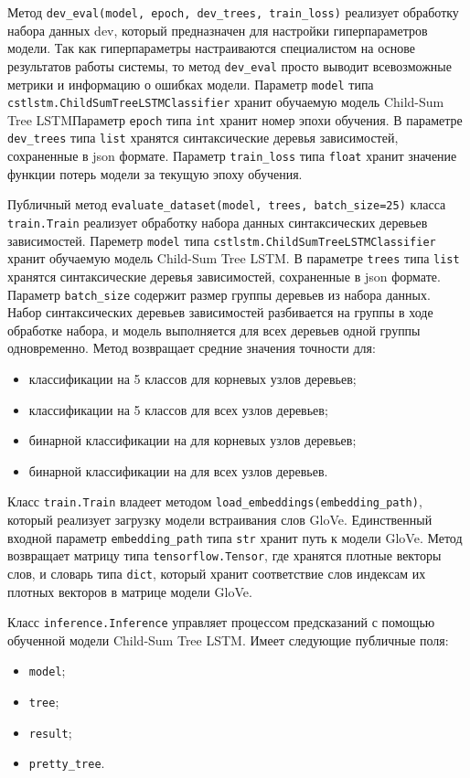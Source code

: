 Метод \texttt{dev\_eval(model, epoch, dev\_trees, train\_loss)} реализует обработку набора данных dev, который предназначен для настройки гиперпараметров модели. Так как гиперпараметры настраиваются специалистом на основе результатов работы системы, то метод \texttt{dev\_eval} просто выводит всевозможные метрики и информацию о ошибках модели. Параметр \texttt{model} типа \texttt{cstlstm.ChildSumTreeLSTMClassifier} хранит обучаемую модель Child-Sum Tree LSTM\@ Параметр \texttt{epoch} типа \texttt{int} хранит номер эпохи обучения. В параметре \texttt{dev\_trees} типа \texttt{list} хранятся синтаксические деревья зависимостей, сохраненные в json формате. Параметр \texttt{train\_loss} типа \texttt{float} хранит значение функции потерь модели за текущую эпоху обучения.

Публичный метод \texttt{evaluate\_dataset(model, trees, batch\_\-size=25)} класса \texttt{train.Train} реализует обработку набора данных синтаксических деревьев зависимостей. Пареметр \texttt{model} типа \texttt{cstlstm.Chi\-ldSumTreeLSTMCla\-ssifier} хранит обучаемую модель Child-Sum Tree LSTM\@. В параметре \texttt{trees} типа \texttt{list} хранятся синтаксические деревья зависимостей, сохраненные в json формате. Параметр \texttt{batch\_size} содержит размер группы деревьев из набора данных. Набор синтаксических деревьев зависимостей разбивается на группы в ходе обработке набора, и модель выполняется для всех деревьев одной группы одновременно. Метод возвращает средние значения точности для:
\begin{itemize}
\item классификации на 5 классов для корневых узлов деревьев;
\item классификации на 5 классов для всех узлов деревьев;
\item бинарной классификации на для корневых узлов деревьев;
\item бинарной классификации на для всех узлов деревьев.
\end{itemize}

Класс \texttt{train.Train} владеет методом \texttt{load\_embeddings(embed\-ding\_path)}, который реализует загрузку модели встраивания слов GloVe. Единственный входной параметр \texttt{embedding\_path} типа \texttt{str} хранит путь к модели GloVe. Метод возвращает матрицу типа \texttt{tensorflow.Tensor}, где хранятся плотные векторы слов, и словарь типа \texttt{dict}, который хранит соответствие слов индексам их плотных векторов в матрице модели GloVe.

Класс \texttt{inference.Inference} управляет процессом предсказаний с помощью обученной модели Child-Sum Tree LSTM\@. Имеет следующие публичные поля:
\begin{itemize}
\item \texttt{model};
\item \texttt{tree};
\item \texttt{result};
\item \texttt{pretty\_tree}.
\end{itemize}

